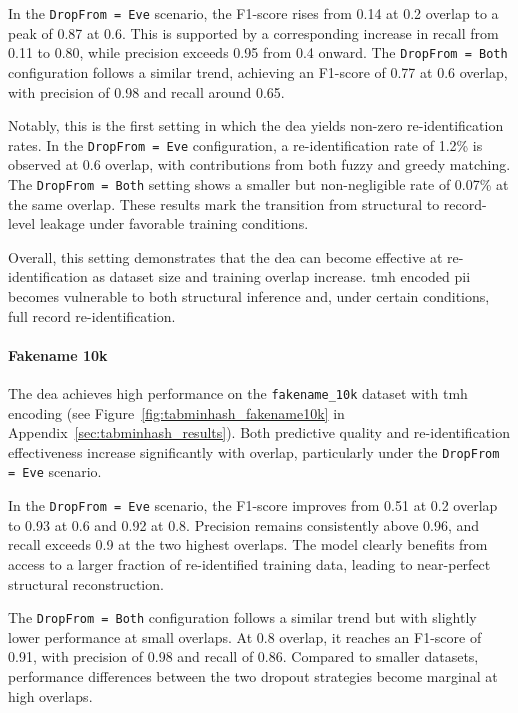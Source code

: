 In the \texttt{DropFrom = Eve} scenario, the F1-score rises from 0.14 at 0.2 overlap to a peak of 0.87 at 0.6.
This is supported by a corresponding increase in recall from 0.11 to 0.80, while precision exceeds 0.95 from 0.4 onward.
The \texttt{DropFrom = Both} configuration follows a similar trend, achieving an F1-score of 0.77 at 0.6 overlap, with precision of 0.98 and recall around 0.65.

Notably, this is the first setting in which the \ac{dea} yields non-zero re-identification rates.
In the \texttt{DropFrom = Eve} configuration, a re-identification rate of 1.2\% is observed at 0.6 overlap, with contributions from both fuzzy and greedy matching.
The \texttt{DropFrom = Both} setting shows a smaller but non-negligible rate of 0.07\% at the same overlap.
These results mark the transition from structural to record-level leakage under favorable training conditions.



Overall, this setting demonstrates that the \ac{dea} can become effective at re-identification as dataset size and training overlap increase.
\ac{tmh} encoded \ac{pii} becomes vulnerable to both structural inference and, under certain conditions, full record re-identification.


\paragraph{Fakename 10k}

The \ac{dea} achieves high performance on the \texttt{fakename\_10k} dataset with \ac{tmh} encoding (see Figure~\ref{fig:tabminhash_fakename10k} in Appendix~\ref{sec:tabminhash_results}).
Both predictive quality and re-identification effectiveness increase significantly with overlap, particularly under the \texttt{DropFrom = Eve} scenario.

In the \texttt{DropFrom = Eve} scenario, the F1-score improves from 0.51 at 0.2 overlap to 0.93 at 0.6 and 0.92 at 0.8.
Precision remains consistently above 0.96, and recall exceeds 0.9 at the two highest overlaps.
The model clearly benefits from access to a larger fraction of re-identified training data, leading to near-perfect structural reconstruction.

The \texttt{DropFrom = Both} configuration follows a similar trend but with slightly lower performance at small overlaps.
At 0.8 overlap, it reaches an F1-score of 0.91, with precision of 0.98 and recall of 0.86.
Compared to smaller datasets, performance differences between the two dropout strategies become marginal at high overlaps.

